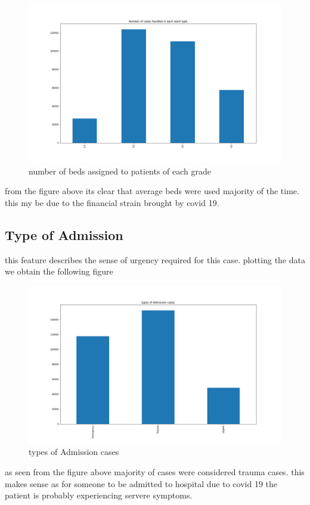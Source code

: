 \documentclass[fleqn]{article}
\begin{document}
			 \begin{figure}[hb]
  				\includegraphics[width=\linewidth]{bed_hist.png}
  				\caption{number of beds assigned to patients of each grade}
  				\label{fig:6}
			\end{figure} 
			\FloatBarrier	
			
			from the figure above its clear that average beds were used majority of 				the time. this my be due to the financial strain brought by covid 19.
			
			
		\subsection*{Type of Admission}
			this feature describes the sense of urgency required for this case. 					plotting the data we obtain the following figure
			
			\begin{figure}[hb]
  				\includegraphics[width=\linewidth]{admin_hist.png}
  				\caption{types of Admission cases}
  				\label{fig:6}
			\end{figure} 
			\FloatBarrier
			
			as seen from the figure above majority of cases were considered trauma 					cases. this makes sense as for someone to be admitted to hospital due to 			covid 19 the patient is probably experiencing servere symptoms.
			
\end{document}
